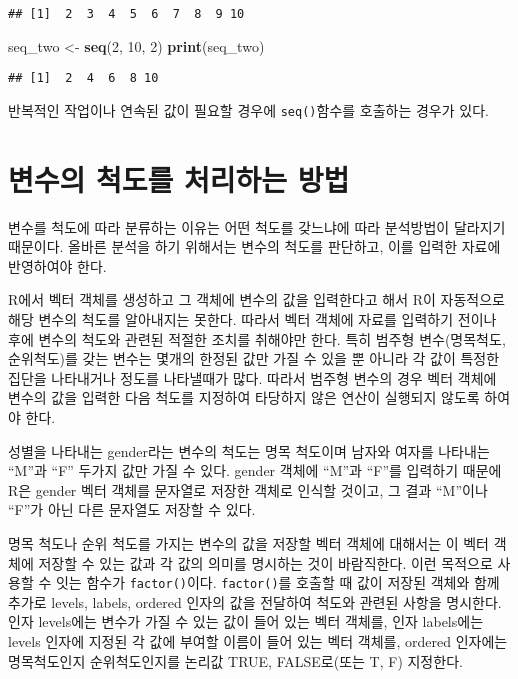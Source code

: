 \documentclass[
]{article}
\newenvironment{Shaded}{\begin{snugshade}}{\end{snugshade}}
\newcommand{\DecValTok}[1]{\textcolor[rgb]{0.00,0.00,0.81}{#1}}
\newcommand{\FunctionTok}[1]{\textcolor[rgb]{0.13,0.29,0.53}{\textbf{#1}}}
\newcommand{\NormalTok}[1]{#1}
\newcommand{\OtherTok}[1]{\textcolor[rgb]{0.56,0.35,0.01}{#1}}
\begin{document}
\begin{verbatim}
## [1]  2  3  4  5  6  7  8  9 10
\end{verbatim}

\begin{Shaded}
\begin{Highlighting}[]
\NormalTok{seq\_two }\OtherTok{\textless{}{-}} \FunctionTok{seq}\NormalTok{(}\DecValTok{2}\NormalTok{, }\DecValTok{10}\NormalTok{, }\DecValTok{2}\NormalTok{)}
\FunctionTok{print}\NormalTok{(seq\_two)}
\end{Highlighting}
\end{Shaded}

\begin{verbatim}
## [1]  2  4  6  8 10
\end{verbatim}

반복적인 작업이나 연속된 값이 필요할 경우에 \texttt{seq()}함수를
호출하는 경우가 있다.

\hypertarget{uxbcc0uxc218uxc758-uxcc99uxb3c4uxb97c-uxcc98uxb9acuxd558uxb294-uxbc29uxbc95}{%
\section{변수의 척도를 처리하는
방법}\label{uxbcc0uxc218uxc758-uxcc99uxb3c4uxb97c-uxcc98uxb9acuxd558uxb294-uxbc29uxbc95}}

변수를 척도에 따라 분류하는 이유는 어떤 척도를 갖느냐에 따라 분석방법이
달라지기 때문이다. 올바른 분석을 하기 위해서는 변수의 척도를 판단하고,
이를 입력한 자료에 반영하여야 한다.

R에서 벡터 객체를 생성하고 그 객체에 변수의 값을 입력한다고 해서 R이
자동적으로 해당 변수의 척도를 알아내지는 못한다. 따라서 벡터 객체에
자료를 입력하기 전이나 후에 변수의 척도와 관련된 적절한 조치를 취해야만
한다. 특히 범주형 변수(명목척도, 순위척도)를 갖는 변수는 몇개의 한정된
값만 가질 수 있을 뿐 아니라 각 값이 특정한 집단을 나타내거나 정도를
나타낼때가 많다. 따라서 범주형 변수의 경우 벡터 객체에 변수의 값을
입력한 다음 척도를 지정하여 타당하지 않은 연산이 실행되지 않도록 하여야
한다.

성별을 나타내는 gender라는 변수의 척도는 명목 척도이며 남자와 여자를
나타내는 ``M''과 ``F'' 두가지 값만 가질 수 있다. gender 객체에 ``M''과
``F''를 입력하기 때문에 R은 gender 벡터 객체를 문자열로 저장한 객체로
인식할 것이고, 그 결과 ``M''이나 ``F''가 아닌 다른 문자열도 저장할 수
있다.

명목 척도나 순위 척도를 가지는 변수의 값을 저장할 벡터 객체에 대해서는
이 벡터 객체에 저장할 수 있는 값과 각 값의 의미를 명시하는 것이
바람직한다. 이런 목적으로 사용할 수 잇는 함수가 \texttt{factor()}이다.
\texttt{factor()}를 호출할 때 값이 저장된 객체와 함께 추가로 levels,
labels, ordered 인자의 값을 전달하여 척도와 관련된 사항을 명시한다. 인자
levels에는 변수가 가질 수 있는 값이 들어 있는 벡터 객체를, 인자
labels에는 levels 인자에 지정된 각 값에 부여할 이름이 들어 있는 벡터
객체를, ordered 인자에는 명목척도인지 순위척도인지를 논리값 TRUE,
FALSE로(또는 T, F) 지정한다.
\end{document}
